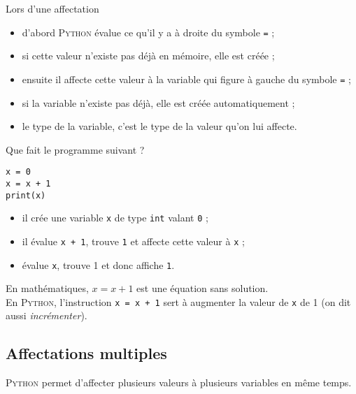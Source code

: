 \begin{definition}[ : affectation]
	Lors d'une affectation
	\begin{itemize}
		\item d'abord \textsc{Python} évalue ce qu'il y a à droite du symbole \texttt{=} ;
		\item si cette valeur n'existe pas déjà en mémoire, elle est créée ;
		\item ensuite il affecte cette valeur à la variable qui figure à gauche du symbole \texttt{=} ;
		\item si la variable n'existe pas déjà, elle est créée automatiquement ;
		\item le type de la variable, c'est le type de la valeur qu'on lui affecte.
	\end{itemize}
\end{definition}
Que fait le programme suivant ?

\begin{pyc}
	\begin{verbatim}
x = 0
x = x + 1
print(x)    
\end{verbatim}
\end{pyc}

\begin{itemize}
	\item il crée une variable \texttt{x} de type \texttt{int} valant \texttt{0} ;
	\item il évalue \texttt{x + 1}, trouve \texttt{1} et affecte cette valeur à \texttt{x} ;
	\item évalue \texttt{x}, trouve 1 et donc affiche \texttt{1}.
\end{itemize}

\begin{aretenir}
	En mathématiques, $x = x + 1$ est une équation sans solution.\\

	En \textsc{Python}, l'instruction \texttt{x = x + 1} sert à augmenter la valeur de \texttt{x} de 1 (on dit aussi \textit{incrémenter}).
\end{aretenir}

\subsection{Affectations multiples}
\textsc{Python} permet d'affecter plusieurs valeurs à plusieurs variables en même temps.

